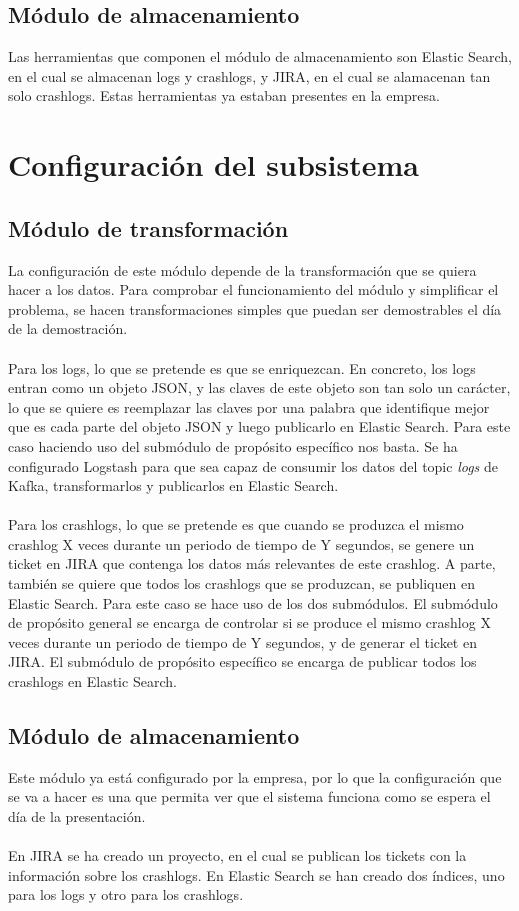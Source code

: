 \subsection{Módulo de almacenamiento}
Las herramientas que componen el módulo de almacenamiento son Elastic Search, en el cual se almacenan logs y crashlogs, y JIRA, en el cual se alamacenan tan solo crashlogs. Estas herramientas ya estaban presentes en la empresa.

\section{Configuración del subsistema}

\subsection{Módulo de transformación}
La configuración de este módulo depende de la transformación que se quiera hacer a los datos. Para comprobar el funcionamiento del módulo y simplificar el problema, se hacen transformaciones simples que puedan ser demostrables el día de la demostración.
\\\\
Para los logs, lo que se pretende es que se enriquezcan. En concreto, los logs entran como un objeto JSON, y las claves de este objeto son tan solo un carácter, lo que se quiere es reemplazar las claves por una palabra que identifique mejor que es cada parte del objeto JSON y luego publicarlo en Elastic Search. Para este caso haciendo uso del submódulo de propósito específico nos basta. Se ha configurado Logstash para que sea capaz de consumir los datos del topic \textit{logs} de Kafka, transformarlos y publicarlos en Elastic Search. 
\\\\
Para los crashlogs, lo que se pretende es que cuando se produzca el mismo crashlog X veces durante un periodo de tiempo de Y segundos, se genere un ticket en JIRA que contenga los datos más relevantes de este crashlog. A parte, también se quiere que todos los crashlogs que se produzcan, se publiquen en Elastic Search. Para este caso se hace uso de los dos submódulos. El submódulo de propósito general se encarga de controlar si se produce el mismo crashlog X veces durante un periodo de tiempo de Y segundos, y de generar el ticket en JIRA. El submódulo de propósito específico se encarga de publicar todos los crashlogs en Elastic Search.

\subsection{Módulo de almacenamiento}
Este módulo ya está configurado por la empresa, por lo que la configuración que se va a hacer es una que permita ver que el sistema funciona como se espera el día de la presentación.
\\\\
En JIRA se ha creado un proyecto, en el cual se publican los tickets con la información sobre los crashlogs.
En Elastic Search se han creado dos índices, uno para los logs y otro para los crashlogs.

